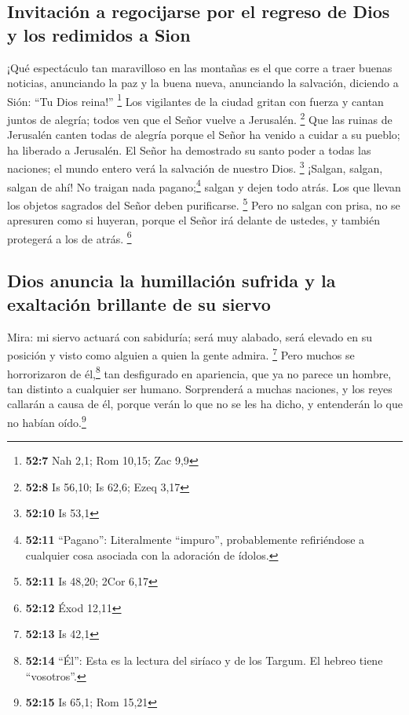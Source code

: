 \hypertarget{invitaciuxf3n-a-regocijarse-por-el-regreso-de-dios-y-los-redimidos-a-sion}{%
\subsection{Invitación a regocijarse por el regreso de Dios y los
redimidos a
Sion}\label{invitaciuxf3n-a-regocijarse-por-el-regreso-de-dios-y-los-redimidos-a-sion}}

 ¡Qué espectáculo tan maravilloso en las montañas es el
que corre a traer buenas noticias, anunciando la paz y la buena nueva,
anunciando la salvación, diciendo a Sión: ``Tu Dios reina!'' \footnote{\textbf{52:7}
  Nah 2,1; Rom 10,15; Zac 9,9}  Los vigilantes de la
ciudad gritan con fuerza y cantan juntos de alegría; todos ven que el
Señor vuelve a Jerusalén. \footnote{\textbf{52:8} Is 56,10; Is 62,6;
  Ezeq 3,17}  Que las ruinas de Jerusalén canten todas de
alegría porque el Señor ha venido a cuidar a su pueblo; ha liberado a
Jerusalén.  El Señor ha demostrado su santo poder a todas
las naciones; el mundo entero verá la salvación de nuestro Dios.
\footnote{\textbf{52:10} Is 53,1}  ¡Salgan, salgan,
salgan de ahí! No traigan nada pagano;\footnote{\textbf{52:11}
  ``Pagano'': Literalmente ``impuro'', probablemente refiriéndose a
  cualquier cosa asociada con la adoración de ídolos.} salgan y dejen
todo atrás. Los que llevan los objetos sagrados del Señor deben
purificarse. \footnote{\textbf{52:11} Is 48,20; 2Cor 6,17}
 Pero no salgan con prisa, no se apresuren como si
huyeran, porque el Señor irá delante de ustedes, y también protegerá a
los de atrás. \footnote{\textbf{52:12} Éxod 12,11}

\hypertarget{dios-anuncia-la-humillaciuxf3n-sufrida-y-la-exaltaciuxf3n-brillante-de-su-siervo}{%
\subsection{Dios anuncia la humillación sufrida y la exaltación
brillante de su
siervo}\label{dios-anuncia-la-humillaciuxf3n-sufrida-y-la-exaltaciuxf3n-brillante-de-su-siervo}}

 Mira: mi siervo actuará con sabiduría; será muy alabado,
será elevado en su posición y visto como alguien a quien la gente
admira. \footnote{\textbf{52:13} Is 42,1}  Pero muchos se
horrorizaron de él,\footnote{\textbf{52:14} ``Él'': Esta es la lectura
  del siríaco y de los Targum. El hebreo tiene ``vosotros''.} tan
desfigurado en apariencia, que ya no parece un hombre, tan distinto a
cualquier ser humano.  Sorprenderá a muchas naciones, y
los reyes callarán a causa de él, porque verán lo que no se les ha
dicho, y entenderán lo que no habían oído.\footnote{\textbf{52:15} Is
  65,1; Rom 15,21}

